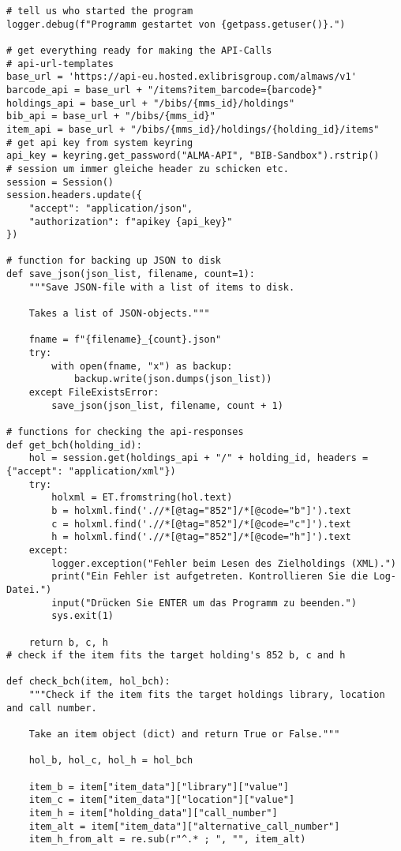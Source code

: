 \documentclass[10pt, a4paper]{scrartcl}
\begin{document}
\begin{verbatim}
# tell us who started the program
logger.debug(f"Programm gestartet von {getpass.getuser()}.")

# get everything ready for making the API-Calls
# api-url-templates
base_url = 'https://api-eu.hosted.exlibrisgroup.com/almaws/v1'
barcode_api = base_url + "/items?item_barcode={barcode}"
holdings_api = base_url + "/bibs/{mms_id}/holdings"
bib_api = base_url + "/bibs/{mms_id}"
item_api = base_url + "/bibs/{mms_id}/holdings/{holding_id}/items"
# get api key from system keyring
api_key = keyring.get_password("ALMA-API", "BIB-Sandbox").rstrip()
# session um immer gleiche header zu schicken etc.
session = Session()
session.headers.update({
    "accept": "application/json",
    "authorization": f"apikey {api_key}"
})

# function for backing up JSON to disk
def save_json(json_list, filename, count=1):
    """Save JSON-file with a list of items to disk.

    Takes a list of JSON-objects."""

    fname = f"{filename}_{count}.json"
    try:
        with open(fname, "x") as backup:
            backup.write(json.dumps(json_list))
    except FileExistsError:
        save_json(json_list, filename, count + 1)

# functions for checking the api-responses
def get_bch(holding_id):
    hol = session.get(holdings_api + "/" + holding_id, headers = {"accept": "application/xml"})
    try:
        holxml = ET.fromstring(hol.text)
        b = holxml.find('.//*[@tag="852"]/*[@code="b"]').text
        c = holxml.find('.//*[@tag="852"]/*[@code="c"]').text
        h = holxml.find('.//*[@tag="852"]/*[@code="h"]').text
    except:
        logger.exception("Fehler beim Lesen des Zielholdings (XML).")
        print("Ein Fehler ist aufgetreten. Kontrollieren Sie die Log-Datei.")
        input("Drücken Sie ENTER um das Programm zu beenden.")
        sys.exit(1)

    return b, c, h
# check if the item fits the target holding's 852 b, c and h

def check_bch(item, hol_bch):
    """Check if the item fits the target holdings library, location and call number.

    Take an item object (dict) and return True or False."""

    hol_b, hol_c, hol_h = hol_bch

    item_b = item["item_data"]["library"]["value"]
    item_c = item["item_data"]["location"]["value"]
    item_h = item["holding_data"]["call_number"]
    item_alt = item["item_data"]["alternative_call_number"]
    item_h_from_alt = re.sub(r"^.* ; ", "", item_alt)


\end{verbatim}
\end{document}
